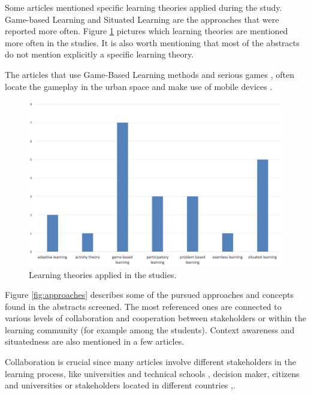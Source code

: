 Some articles mentioned specific learning theories applied during the study. Game-based Learning and Situated Learning \cite{anderson_situated_1996} are the approaches that were reported more often.
Figure \ref{fig:learn_theories} pictures which learning theories are mentioned more often in the studies. It is also worth mentioning that most of the abstracts do not mention explicitly a specific learning theory.

The articles that use Game-Based Learning methods and serious games \cite{poplin_digital_2014-2}, often locate the gameplay in the urban space and make use of mobile devices \cite{huizenga_cognitive_2008}.

\begin{figure}[htb]
\centering
\includegraphics[width=12cm]{img/learning_theories}
\caption{Learning theories applied in the studies.}
\label{fig:learn_theories}
\end{figure}

Figure \ref{fig:approaches} describes some of the pursued approaches and concepts found in the abstracts screened.
The most referenced ones are connected to various levels of collaboration and cooperation between stakeholders or within the learning community (for example among the students). Context awareness and situatedness are also mentioned in a few articles.

Collaboration is crucial since many articles involve different stakeholders in the learning process, like universities and technical schools \cite{lee_platform_2011}, decision maker, citizens and universities \cite{evans_give_2014} or stakeholders located in different countries \cite{ross_facilitating_2009},\cite{severengiz_enhancing_2015}.

